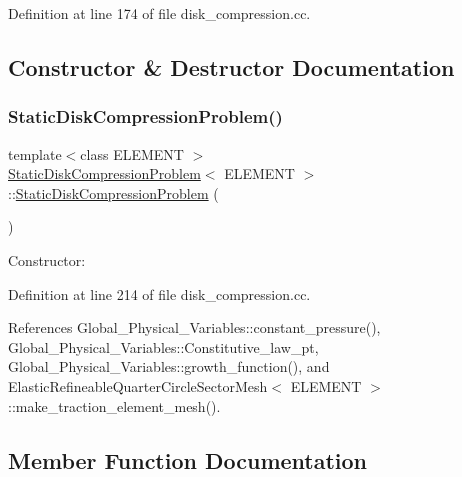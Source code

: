 Definition at line 174 of file disk\+\_\+compression.\+cc.



\subsection{Constructor \& Destructor Documentation}
\mbox{\label{classStaticDiskCompressionProblem_a462e81aec225a5d6204b579719b3db87}} 
\subsubsection{\texorpdfstring{Static\+Disk\+Compression\+Problem()}{StaticDiskCompressionProblem()}}
{\footnotesize\ttfamily template$<$class E\+L\+E\+M\+E\+NT $>$ \\
\hyperlink{classStaticDiskCompressionProblem}{Static\+Disk\+Compression\+Problem}$<$ E\+L\+E\+M\+E\+NT $>$\+::\hyperlink{classStaticDiskCompressionProblem}{Static\+Disk\+Compression\+Problem} (\begin{DoxyParamCaption}{ }\end{DoxyParamCaption})}



Constructor\+: 



Definition at line 214 of file disk\+\_\+compression.\+cc.



References Global\+\_\+\+Physical\+\_\+\+Variables\+::constant\+\_\+pressure(), Global\+\_\+\+Physical\+\_\+\+Variables\+::\+Constitutive\+\_\+law\+\_\+pt, Global\+\_\+\+Physical\+\_\+\+Variables\+::growth\+\_\+function(), and Elastic\+Refineable\+Quarter\+Circle\+Sector\+Mesh$<$ E\+L\+E\+M\+E\+N\+T $>$\+::make\+\_\+traction\+\_\+element\+\_\+mesh().



\subsection{Member Function Documentation}
\mbox{\label{classStaticDiskCompressionProblem_a484b47d6a10a91cbd30cb807a49b1f58}} 
